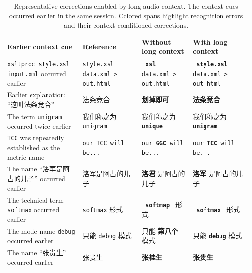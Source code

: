 \documentclass{article}
\newcommand{\bad}[1]{%
  \textcolor{ErrorRed}{\bfseries #1}%
}
\newcommand{\good}[1]{%
  \textcolor{QwenPurple}{\bfseries #1}%
}
\begin{document}
\begin{table}[t]
\centering

\begin{CJK*}{UTF8}{gbsn}

\caption{
Representative corrections enabled by long-audio context.
The context cues occurred earlier in the same session.
Colored spans highlight recognition errors and their
context-conditioned corrections.
}
\label{tab:long-context-examples}

\begingroup
\small
\renewcommand{\arraystretch}{1.22}
\setlength{\tabcolsep}{5pt}

\begin{tabular}{
  @{}
  V{0.27\textwidth}
  V{0.23\textwidth}
  V{0.22\textwidth}
  V{0.22\textwidth}
  @{}
}
\toprule

\textbf{Earlier context cue}
&
\textbf{Reference}
&
\textbf{Without long context}
&
\textbf{With long context}
\\

\midrule

\texttt{xsltproc style.xsl input.xml}
occurred earlier
&
\texttt{style.xsl data.xml > out.html}
&
\texttt{\bad{xsl} data.xml > out.html}
&
\texttt{\good{style.xsl} data.xml > out.html}
\\

Earlier explanation:
“这叫法条竞合”
&
法条竞合
&
\bad{划掉即可}
&
\good{法条竞合}
\\

The term \texttt{unigram}
occurred twice earlier
&
我们称之为 \texttt{unigram}
&
我们称之为 \bad{\texttt{unique}}
&
我们称之为 \good{\texttt{unigram}}
\\

\texttt{TCC} was repeatedly
established as the metric name
&
\texttt{our TCC will be...}
&
\texttt{our \bad{GGC} will be...}
&
\texttt{our \good{TCC} will be...}
\\

The name “洛军是阿占的儿子”
occurred earlier
&
洛军是阿占的儿子
&
\bad{洛君}是阿占的儿子
&
\good{洛军}是阿占的儿子
\\

The technical term
\texttt{softmax} occurred earlier
&
\texttt{softmax} 形式
&
\texttt{\bad{softmap}} 形式
&
\texttt{\good{softmax}} 形式
\\

The mode name
\texttt{debug} occurred earlier
&
只能 \texttt{debug} 模式
&
只能 \bad{第八个} 模式
&
只能 \good{\texttt{debug}} 模式
\\

The name “张贵生”
occurred earlier
&
张贵生
&
\bad{张桂生}
&
\good{张贵生}
\\

\bottomrule
\end{tabular}

\endgroup
\end{CJK*}
\end{table}
\end{document}

